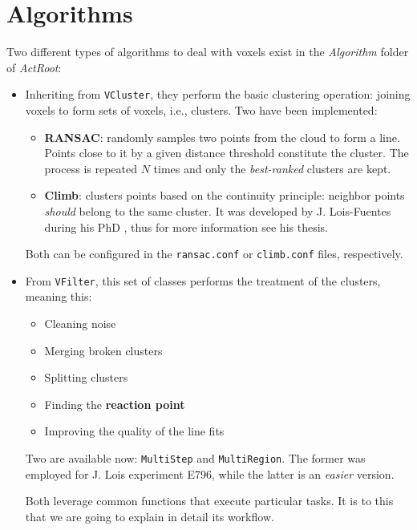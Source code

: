 \documentclass[11pt, a4paper, english]{article}
\begin{document}
\section{Algorithms}
Two different types of algorithms to deal with voxels exist in the \textit{Algorithm} folder of \textit{ActRoot}:
\begin{itemize}
	\item Inheriting from \lstinline{VCluster}, they perform the basic clustering operation: joining voxels to form sets of voxels, i.e., clusters. Two have been implemented:
	      \begin{itemize}
		      \item \textbf{RANSAC}: randomly samples two points from the cloud to form a line. Points close to it by a given distance threshold constitute the cluster. The process is repeated $N$ times and only the \textit{best-ranked} clusters are kept.
		      \item \textbf{Climb}: clusters points based on the continuity principle: neighbor points \textit{should} belong to the same cluster. It was developed by J. Lois-Fuentes during his PhD \cite{lois23}, thus for more information see his thesis.
	      \end{itemize}
	      Both can be configured in the \verb|ransac.conf| or \verb|climb.conf| files, respectively.
	\item From \lstinline|VFilter|, this set of classes performs the treatment of the clusters, meaning this:
	      \begin{itemize}
		      \item Cleaning noise
		      \item Merging broken clusters
		      \item Splitting clusters
		      \item Finding the \textbf{reaction point}
		      \item Improving the quality of the line fits
	      \end{itemize}
	      Two are available now: \lstinline|MultiStep| and \lstinline|MultiRegion|. The former was employed for J. Lois experiment E796, while the latter is an \textit{easier} version.

	      Both leverage common functions that execute particular tasks. It is to this that we are going to explain in detail its workflow.
\end{itemize}
\end{document}
